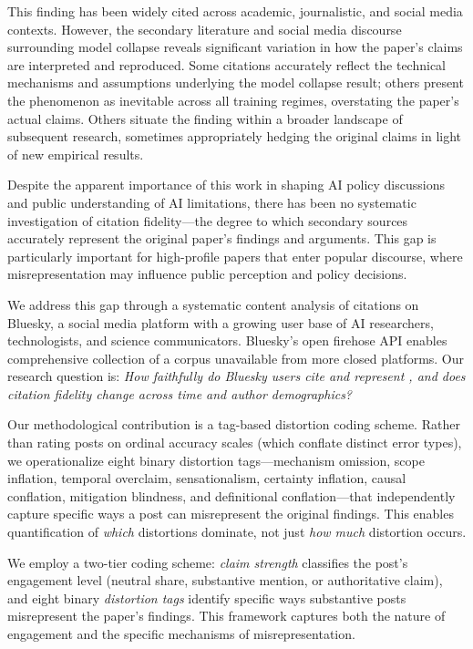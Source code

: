 \documentclass[twocolumn,11pt]{article}
\begin{document}
This finding has been widely cited across academic, journalistic, and social media contexts. However, the secondary literature and social media discourse surrounding model collapse reveals significant variation in how the paper's claims are interpreted and reproduced. Some citations accurately reflect the technical mechanisms and assumptions underlying the model collapse result; others present the phenomenon as inevitable across all training regimes, overstating the paper's actual claims. Others situate the finding within a broader landscape of subsequent research, sometimes appropriately hedging the original claims in light of new empirical results.

Despite the apparent importance of this work in shaping AI policy discussions and public understanding of AI limitations, there has been no systematic investigation of citation fidelity—the degree to which secondary sources accurately represent the original paper's findings and arguments. This gap is particularly important for high-profile papers that enter popular discourse, where misrepresentation may influence public perception and policy decisions.

We address this gap through a systematic content analysis of \cite{Shumailov2024} citations on Bluesky, a social media platform with a growing user base of AI researchers, technologists, and science communicators. Bluesky's open firehose API enables comprehensive collection of a corpus unavailable from more closed platforms. Our research question is: \textit{How faithfully do Bluesky users cite and represent \cite{Shumailov2024}, and does citation fidelity change across time and author demographics?}

Our methodological contribution is a tag-based distortion coding scheme. Rather than rating posts on ordinal accuracy scales (which conflate distinct error types), we operationalize eight binary distortion tags---mechanism omission, scope inflation, temporal overclaim, sensationalism, certainty inflation, causal conflation, mitigation blindness, and definitional conflation---that independently capture specific ways a post can misrepresent the original findings. This enables quantification of \textit{which} distortions dominate, not just \textit{how much} distortion occurs.

We employ a two-tier coding scheme: \textit{claim strength} classifies the post's engagement level (neutral share, substantive mention, or authoritative claim), and eight binary \textit{distortion tags} identify specific ways substantive posts misrepresent the paper's findings. This framework captures both the nature of engagement and the specific mechanisms of misrepresentation.
\end{document}
